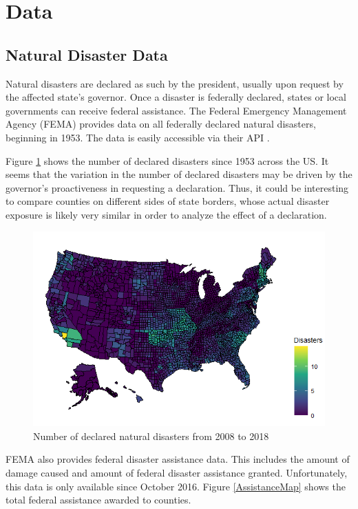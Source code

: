
\section{Data}

\subsection{Natural Disaster Data}

Natural disasters are declared as such by the president, usually upon request by the affected state's governor. Once a disaster is federally declared, states or local governments can receive federal assistance. The Federal Emergency Management Agency (FEMA) provides data on all federally declared natural disasters, beginning in 1953. The data is easily accessible via their API \citep{rfema}.

Figure \ref{DisasterMap} shows the number of declared disasters since 1953 across the US. It seems that the variation in the number of declared disasters may be driven by the governor's proactiveness in requesting a declaration. Thus, it could be interesting to compare counties on different sides of state borders, whose actual disaster exposure is likely very similar in order to analyze the effect of a declaration.



\begin{figure}[!h]
	\centering
	\includegraphics[scale=0.7]{"../Code & Data/DisasterMap.png"}
	\caption{Number of declared natural disasters from 2008 to 2018}
	\label{DisasterMap}
\end{figure}


FEMA also provides federal disaster assistance data. This includes the amount of damage caused and amount of federal disaster assistance granted. Unfortunately, this data is only available since October 2016. Figure \ref{AssistanceMap} shows the total federal assistance awarded to counties.


